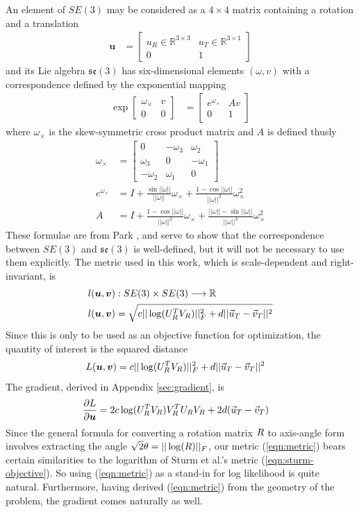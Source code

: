 \documentclass[letterpaper, 10 pt, conference]{ieeeconf}  %
\newcommand\mat[2]{\ensuremath{\left[\begin{array}{#1}#2\end{array}\right]}}
\newcommand\deriv[2]{\ensuremath{\frac{\partial #1}{\partial #2}}}
\def\xmat{\uppercase}    \def\xmatstr{in uppercase}
\def\xvec{\vec}          \def\xvecstr{with an arrow}
\def\xse{\bm}            \def\xsestr{in boldface}
\begin{document}
An element of $SE(3)$ may be considered as a $4 \times 4$ matrix containing a rotation and a translation
\begin{align}
  \xse{u} &= \mat{c|c}{ u_R \in \mathbb{R}^{3 \times 3} & u_T \in \mathbb{R}^{3 \times 1} \\\hline 0 & 1 }
\end{align}
and its Lie algebra $\mathfrak{se}(3)$ has six-dimensional elements $(\omega, v)$ with a correspondence defined by the exponential mapping
\begin{align}
  \exp{\mat{c|c}{ \omega_\times & v \\\hline 0 & 0 }} &= \mat{c|c}{ e^{\omega_\times} & Av \\\hline 0 & 1}
\end{align}
where $\omega_\times$ is the skew-symmetric cross product matrix and $A$ is defined thusly
\begin{align}
  \omega_\times &= \mat{ccc}{ 0 & -\omega_3 & \omega_2 \\ \omega_3 & 0 & -\omega_1 \\ -\omega_2 & \omega_1 & 0 } \\
  e^{\omega_\times} &= I + \frac{\sin||\omega||}{||\omega||} \omega_\times + \frac{1 - \cos{||\omega||}}{||\omega||^2} \omega_\times^2 \\
  A &= I + \frac{1 - \cos{||\omega||}}{||\omega||^2} \omega_\times + \frac{||\omega|| - \sin{||\omega||}}{||\omega||^3} \omega_\times^2
\end{align}
These formulae are from Park \cite{Park1995}, and serve to show that the correspondence between $SE(3)$ and $\mathfrak{se}(3)$ is well-defined, but it will not be necessary to use them explicitly. The metric used in this work, which is scale-dependent and right-invariant, is
\begin{align}
  l&(\xse{u},\xse{v}) : SE(3) \times SE(3) \longrightarrow \mathbb{R} \\
  l&(\xse{u},\xse{v}) = \sqrt{c ||\log(\xmat{u}_R^T \xmat{v}_R)||_F^2 + d ||\xvec{u}_T - \xvec{v}_T||^2} \nonumber
\end{align}
Since this is only to be used as an objective function for optimization, the quantity of interest is the squared distance
\begin{align}
  L&(\xse{u},\xse{v}) = c ||\log(\xmat{u}_R^T \xmat{v}_R)||_F^2 + d ||\xvec{u}_T - \xvec{v}_T||^2 \label{eqn:metric}
\end{align}
The gradient, derived in Appendix \ref{sec:gradient}, is
\begin{align}
  \deriv{L}{\xse{u}} &= 2c\log(\xmat{u}_R^T\xmat{v}_R)\xmat{v}_R^T\xmat{u}_R\xmat{v}_R + 2d(\xvec{u}_T-\xvec{v}_T)
\end{align}
Since the general formula for converting a rotation matrix $\xmat{r}$ to axis-angle form involves extracting the angle ${\sqrt{2}\theta = ||\log(\xmat{r})||_F}$, our metric (\ref{eqn:metric}) bears certain similarities to the logarithm of Sturm et al.'s metric (\ref{eqn:sturm-objective}). So using (\ref{eqn:metric}) as a stand-in for log likelihood is quite natural. Furthermore, having derived (\ref{eqn:metric}) from the geometry of the problem, the gradient comes naturally as well.
\end{document}
